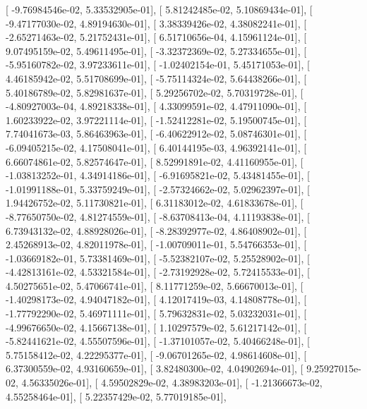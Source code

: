 \documentclass{article}
\begin{document}
       [ -9.76984546e-02,   5.33532905e-01],
       [  5.81242485e-02,   5.10869434e-01],
       [ -9.47177030e-02,   4.89194630e-01],
       [  3.38339426e-02,   4.38082241e-01],
       [ -2.65271463e-02,   5.21752431e-01],
       [  6.51710656e-04,   4.15961124e-01],
       [  9.07495159e-02,   5.49611495e-01],
       [ -3.32372369e-02,   5.27334655e-01],
       [ -5.95160782e-02,   3.97233611e-01],
       [ -1.02402154e-01,   5.45171053e-01],
       [  4.46185942e-02,   5.51708699e-01],
       [ -5.75114324e-02,   5.64438266e-01],
       [  5.40186789e-02,   5.82981637e-01],
       [  5.29256702e-02,   5.70319728e-01],
       [ -4.80927003e-04,   4.89218338e-01],
       [  4.33099591e-02,   4.47911090e-01],
       [  1.60233922e-02,   3.97221114e-01],
       [ -1.52412281e-02,   5.19500745e-01],
       [  7.74041673e-03,   5.86463963e-01],
       [ -6.40622912e-02,   5.08746301e-01],
       [ -6.09405215e-02,   4.17508041e-01],
       [  6.40144195e-03,   4.96392141e-01],
       [  6.66074861e-02,   5.82574647e-01],
       [  8.52991891e-02,   4.41160955e-01],
       [ -1.03813252e-01,   4.34914186e-01],
       [ -6.91695821e-02,   5.43481455e-01],
       [ -1.01991188e-01,   5.33759249e-01],
       [ -2.57324662e-02,   5.02962397e-01],
       [  1.94426752e-02,   5.11730821e-01],
       [  6.31183012e-02,   4.61833678e-01],
       [ -8.77650750e-02,   4.81274559e-01],
       [ -8.63708413e-04,   4.11193838e-01],
       [  6.73943132e-02,   4.88928026e-01],
       [ -8.28392977e-02,   4.86408902e-01],
       [  2.45268913e-02,   4.82011978e-01],
       [ -1.00709011e-01,   5.54766353e-01],
       [ -1.03669182e-01,   5.73381469e-01],
       [ -5.52382107e-02,   5.25528902e-01],
       [ -4.42813161e-02,   4.53321584e-01],
       [ -2.73192928e-02,   5.72415533e-01],
       [  4.50275651e-02,   5.47066741e-01],
       [  8.11771259e-02,   5.66670013e-01],
       [ -1.40298173e-02,   4.94047182e-01],
       [  4.12017419e-03,   4.14808778e-01],
       [ -1.77792290e-02,   5.46971111e-01],
       [  5.79632831e-02,   5.03232031e-01],
       [ -4.99676650e-02,   4.15667138e-01],
       [  1.10297579e-02,   5.61217142e-01],
       [ -5.82441621e-02,   4.55507596e-01],
       [ -1.37101057e-02,   5.40466248e-01],
       [  5.75158412e-02,   4.22295377e-01],
       [ -9.06701265e-02,   4.98614608e-01],
       [  6.37300559e-02,   4.93160659e-01],
       [  3.82480300e-02,   4.04902694e-01],
       [  9.25927015e-02,   4.56335026e-01],
       [  4.59502829e-02,   4.38983203e-01],
       [ -1.21366673e-02,   4.55258464e-01],
       [  5.22357429e-02,   5.77019185e-01],
\end{document}
